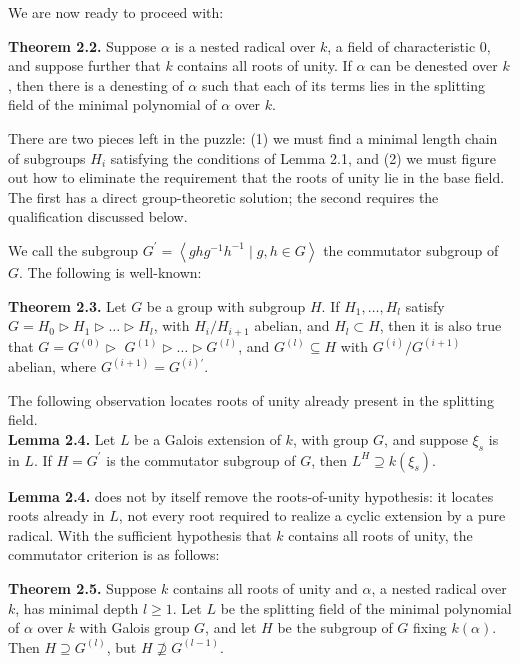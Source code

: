 \documentclass[11pt,letterpaper]{article}
\begin{document}
We are now ready to proceed with:

\noindent\textbf{Theorem 2.2.} Suppose $\alpha$ is a nested radical over $k$, a field of characteristic 0, and suppose further that $k$ contains all roots of unity. If $\alpha$ can be denested over $k$, then there is a denesting of $\alpha$ such that each of its terms lies in the splitting field of the minimal polynomial of $\alpha$ over $k$.

There are two pieces left in the puzzle: (1) we must find a minimal length chain of subgroups $H_{i}$ satisfying the conditions of Lemma 2.1, and (2) we must figure out how to eliminate the requirement that the roots of unity lie in the base field. The first has a direct group-theoretic solution; the second requires the qualification discussed below.

We call the subgroup $G^{\prime}=\left\langle g h g^{-1} h^{-1} \mid g, h \in G\right\rangle$ the commutator subgroup of $G$. The following is well-known:

\noindent\textbf{Theorem 2.3.} Let $G$ be a group with subgroup $H$. If $H_{1}, \ldots, H_{l}$ satisfy $G=H_{0} \triangleright H_{1} \triangleright \ldots \triangleright H_{l}$, with $H_{i} / H_{i+1}$ abelian, and $H_{l} \subset H$, then it is also true that $G=G^{(0)} \triangleright$ $G^{(1)} \triangleright \ldots \triangleright G^{(l)}$, and $G^{(l)} \subseteq H$ with $G^{(i)} / G^{(i+1)}$ abelian, where $G^{(i+1)}=G^{(i) \prime}$.

The following observation locates roots of unity already present in the splitting field.\\
\noindent\textbf{Lemma 2.4.} Let $L$ be a Galois extension of $k$, with group $G$, and suppose $\xi_{s}$ is in $L$. If $H=G^{\prime}$ is the commutator subgroup of $G$, then $L^{H} \supseteq k\left(\xi_{s}\right)$.

\noindent\textbf{Lemma 2.4.} does not by itself remove the roots-of-unity hypothesis: it locates roots already in $L$, not every root required to realize a cyclic extension by a pure radical. With the sufficient hypothesis that $k$ contains all roots of unity, the commutator criterion is as follows:

\noindent\textbf{Theorem 2.5.} Suppose $k$ contains all roots of unity and $\alpha$, a nested radical over $k$, has minimal depth $l\geq1$. Let $L$ be the splitting field of the minimal polynomial of $\alpha$ over $k$ with Galois group $G$, and let $H$ be the subgroup of $G$ fixing $k(\alpha)$. Then $H \supseteq G^{(l)}$, but $H \nsupseteq G^{(l-1)}$.
\end{document}

